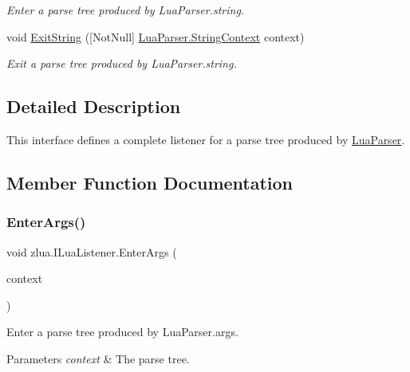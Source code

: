 \begin{DoxyCompactItemize}
\begin{DoxyCompactList}\small\item\em Enter a parse tree produced by Lua\+Parser.\+string. \end{DoxyCompactList}\item 
void \mbox{\hyperlink{interfacezlua_1_1_i_lua_listener_afc8e259f5d8629fd2fd800f847dd62a6}{Exit\+String}} (\mbox{[}Not\+Null\mbox{]} \mbox{\hyperlink{classzlua_1_1_lua_parser_1_1_string_context}{Lua\+Parser.\+String\+Context}} context)
\begin{DoxyCompactList}\small\item\em Exit a parse tree produced by Lua\+Parser.\+string. \end{DoxyCompactList}\end{DoxyCompactItemize}


\subsection{Detailed Description}
This interface defines a complete listener for a parse tree produced by \mbox{\hyperlink{classzlua_1_1_lua_parser}{Lua\+Parser}}. 



\subsection{Member Function Documentation}
\mbox{\label{interfacezlua_1_1_i_lua_listener_a77a4130828fbc6f3827ea87c567e84ac}} 
\subsubsection{\texorpdfstring{Enter\+Args()}{EnterArgs()}}
{\footnotesize\ttfamily void zlua.\+I\+Lua\+Listener.\+Enter\+Args (\begin{DoxyParamCaption}\item[{\mbox{[}\+Not\+Null\mbox{]} \mbox{\hyperlink{classzlua_1_1_lua_parser_1_1_args_context}{Lua\+Parser.\+Args\+Context}}}]{context }\end{DoxyParamCaption})}



Enter a parse tree produced by Lua\+Parser.\+args. 


\begin{DoxyParams}{Parameters}
{\em context} & The parse tree.\\
\hline
\end{DoxyParams}


